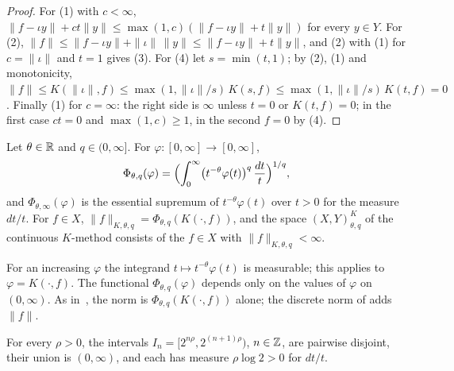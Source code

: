 \begin{proof}
\leanok
For (1) with $c < \infty$, $\|f - \iota y\| + ct \|y\| \leq \max(1, c) (\|f - \iota y\| +
t \|y\|)$ for every $y \in Y$. For (2),
$\|f\| \leq \|f - \iota y\| + \|\iota\| \, \|y\| \leq \|f - \iota y\| + t \|y\|$, and (2) with
(1) for $c = \|\iota\|$ and $t = 1$ gives (3). For (4) let $s = \min(t, 1)$; by (2), (1) and
monotonicity,
$\|f\| \leq K(\|\iota\|, f) \leq \max(1, \|\iota\|/s) \, K(s, f) \leq \max(1, \|\iota\|/s) \,
K(t, f) = 0$. Finally (1) for $c = \infty$: the right side is $\infty$ unless $t = 0$ or
$K(t, f) = 0$; in the first case $ct = 0$ and $\max(1, c) \geq 1$, in the second $f = 0$
by (4).
\end{proof}

\begin{definition}
\label{def:continuous-k-method}
\leanok
{}
Let $\theta \in \mathbb{R}$ and $q \in (0, \infty]$. For $\varphi : [0, \infty] \to [0, \infty]$,
\[
  \Phi_{\theta, q}(\varphi) = \Bigl(\int_0^\infty \bigl(t^{-\theta} \varphi(t)\bigr)^q
  \, \frac{dt}{t}\Bigr)^{1/q} ,
\]
and $\Phi_{\theta, \infty}(\varphi)$ is the essential supremum of $t^{-\theta} \varphi(t)$ over
$t > 0$ for the measure $dt/t$. For $f \in X$, $\|f\|_{K, \theta, q} = \Phi_{\theta, q}(K(\cdot,
f))$, and the space $(X, Y)^K_{\theta, q}$ of the continuous $K$-method consists of the $f \in X$
with $\|f\|_{K, \theta, q} < \infty$.
\end{definition}

For an increasing $\varphi$ the integrand $t \mapsto t^{-\theta} \varphi(t)$ is measurable; this
applies to $\varphi = K(\cdot, f)$. The functional $\Phi_{\theta, q}(\varphi)$ depends only on
the values of $\varphi$ on $(0, \infty)$. As in~\cite[Section~3.1]{BerghLofstrom}, the norm is
$\Phi_{\theta, q}(K(\cdot, f))$ alone; the discrete norm of 
adds $\|f\|$.

\begin{lemma}
\label{lem:dyadic-pieces}
\leanok
{}
For every $\rho > 0$, the intervals $I_n = [2^{n\rho}, 2^{(n+1)\rho})$, $n \in \mathbb{Z}$, are pairwise
disjoint, their union is $(0, \infty)$, and each has measure $\rho \log 2 > 0$ for $dt/t$.
\end{lemma}

